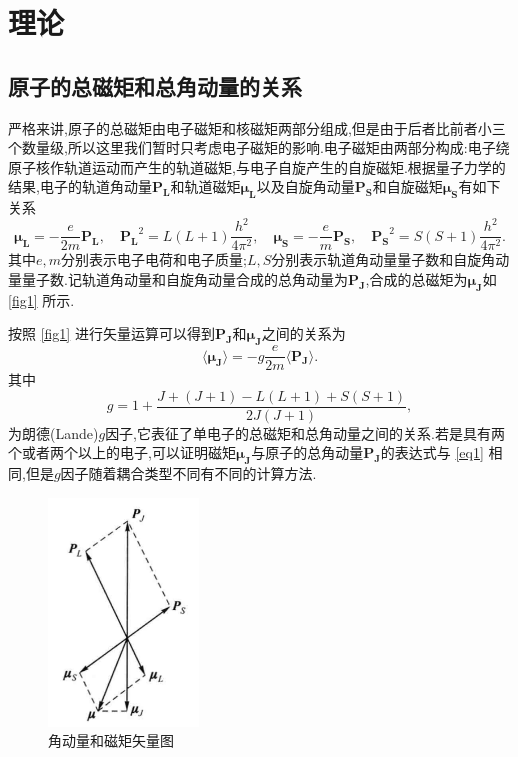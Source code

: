 \documentclass[font=default]{mpltx}
\begin{document}
\section{理论\cite{Book}}
\subsection{原子的总磁矩和总角动量的关系}
严格来讲,原子的总磁矩由电子磁矩和核磁矩两部分组成,但是由于后者比前者小三个数量级,所以这里我们暂时只考虑电子磁矩的影响.电子磁矩由两部分构成:电子绕原子核作轨道运动而产生的轨道磁矩,与电子自旋产生的自旋磁矩.根据量子力学的结果,电子的轨道角动量$\bm{P_L}$和轨道磁矩$\bm{\mu_L}$以及自旋角动量$\bm{P_S}$和自旋磁矩$\bm{\mu_S}$有如下关系$$\bm{\mu_L}=-\frac{e}{2m}\bm{P_L},\quad \bm{P_L}^2=L(L+1)\frac{h^2}{4\pi^2},\quad \bm{\mu_S}=-\frac{e}{m}\bm{P_S},\quad \bm{P_S}^2=S(S+1)\frac{h^2}{4\pi^2}.$$其中$e,m$分别表示电子电荷和电子质量;$L,S$分别表示轨道角动量量子数和自旋角动量量子数.记轨道角动量和自旋角动量合成的总角动量为$\bm{P_J}$,合成的总磁矩为$\bm{\mu_J}$如 \autoref{fig1} 所示.

按照 \autoref{fig1} 进行矢量运算可以得到$\bm{P_J}$和$\bm{\mu_J}$之间的关系为
\begin{equation}\label{eq1}
    \langle \bm{\mu_J}\rangle =-g\frac{e}{2m}\langle\bm{P_J}\rangle.
\end{equation}
其中
\begin{equation}\label{eq_g}
  g=1+\frac{J+(J+1)-L(L+1)+S(S+1)}{2J(J+1)},
\end{equation}
为朗德(Lande)$g$因子,它表征了单电子的总磁矩和总角动量之间的关系.若是具有两个或者两个以上的电子,可以证明磁矩$\bm{\mu_J}$与原子的总角动量$\bm{P_J}$的表达式与 \autoref{eq1} 相同,但是$g$因子随着耦合类型不同有不同的计算方法.
\begin{figure}
    \centering
    \includegraphics[width=4cm]{fig/01.png}
    \caption{\centering 角动量和磁矩矢量图}
    \label{fig1}
\end{figure}
\end{document}
